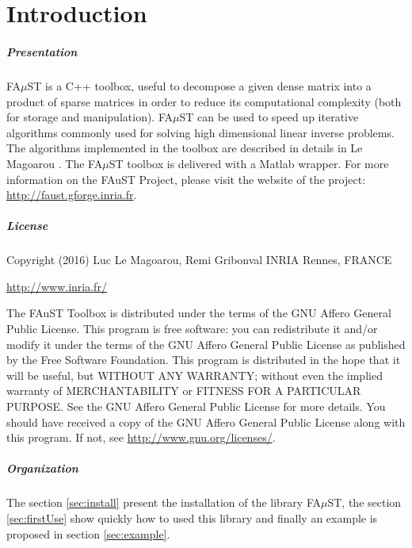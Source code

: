 
\chapter{Introduction}\label{sec:intro}

\paragraph{Presentation} FA$\mu$ST is a C++ toolbox, useful to decompose a given dense matrix into a product of sparse matrices in order to reduce its computational complexity (both for storage and manipulation). 
FA$\mu$ST can be used to speed up iterative algorithms commonly used for solving high dimensional linear inverse problems. The algorithms implemented in the toolbox are described in details in Le Magoarou \cite{LeMagoarou2016}.
The FA$\mu$ST toolbox is delivered with a Matlab wrapper. 
For more information on the FAuST Project, please visit the website of the project: \url{http://faust.gforge.inria.fr}.

\paragraph{License} 
Copyright (2016) Luc Le Magoarou, Remi Gribonval INRIA Rennes, FRANCE 
\begin{center} 
\url{http://www.inria.fr/}
\end{center}

The FAuST Toolbox is distributed under the terms of the GNU Affero General Public License. This program is free software: you can redistribute it and/or modify it under the terms of the GNU Affero General Public License as published by the Free Software Foundation. This program is distributed in the hope that it will be useful, but WITHOUT ANY WARRANTY; without even the implied warranty of MERCHANTABILITY or FITNESS FOR A PARTICULAR PURPOSE.  See the GNU Affero General Public License for more details. You should have received a copy of the GNU Affero General Public License along with this program.  If not, see \url{http://www.gnu.org/licenses/}.


\paragraph{Organization} The section \ref{sec:install} present the installation of the library FA$\mu$ST, the section \ref{sec:firstUse} show quickly how to used this library and finally an example is proposed in section \ref{sec:example}. 